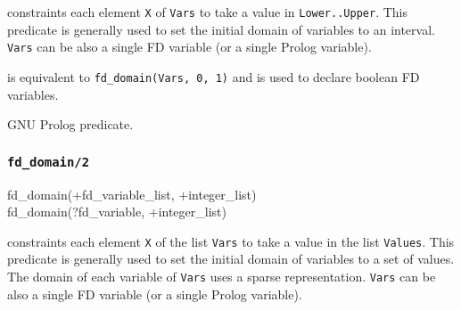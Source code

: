 \Description

 constraints each element \texttt{X}
of \texttt{Vars} to take a value in \texttt{Lower..Upper}. This
predicate is generally used to set the initial domain of variables to an
interval. \texttt{Vars} can be also a single FD variable (or a single Prolog
variable).

 is equivalent to \texttt{fd\_domain(Vars, 0,
1)} and is used to declare boolean FD variables.

\begin{PlErrors}








\end{PlErrors}

\Portability

GNU Prolog predicate.

\subsubsection{\texttt{fd\_domain/2}}

\begin{TemplatesOneCol}
fd\_domain(+fd\_variable\_list, +integer\_list)\\
fd\_domain(?fd\_variable, +integer\_list)

\end{TemplatesOneCol}

\Description

 constraints each element \texttt{X} of the
list \texttt{Vars} to take a value in the list \texttt{Values}. This
predicate is generally used to set the initial domain of variables to a set
of values. The domain of each variable of \texttt{Vars} uses a sparse
representation. \texttt{Vars} can be also a single FD variable (or a single
Prolog variable).


